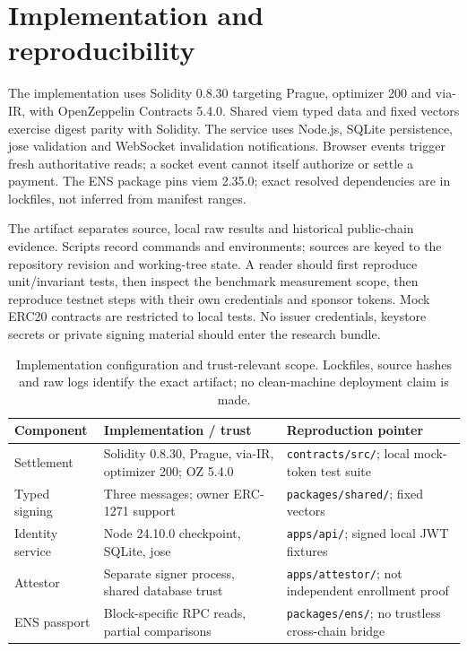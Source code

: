 \documentclass[11pt]{article}
\newcommand{\code}[1]{\nolinkurl{#1}}
\begin{document}

\section{Implementation and reproducibility}
The implementation uses Solidity 0.8.30 targeting Prague, optimizer 200 and via-IR, with OpenZeppelin Contracts 5.4.0. Shared viem typed data and fixed vectors exercise digest parity with Solidity. The service uses Node.js, SQLite persistence, jose validation and WebSocket invalidation notifications. Browser events trigger fresh authoritative reads; a socket event cannot itself authorize or settle a payment. The ENS package pins viem 2.35.0; exact resolved dependencies are in lockfiles, not inferred from manifest ranges.

The artifact separates source, local raw results and historical public-chain evidence. Scripts record commands and environments; sources are keyed to the repository revision and working-tree state. A reader should first reproduce unit/invariant tests, then inspect the benchmark measurement scope, then reproduce testnet steps with their own credentials and sponsor tokens. Mock ERC20 contracts are restricted to local tests. No issuer credentials, keystore secrets or private signing material should enter the research bundle.

\begin{table}[htbp]\centering\small
\begin{tabular}{p{.23\linewidth}p{.34\linewidth}p{.33\linewidth}}\toprule
Component & Implementation / trust & Reproduction pointer\\\midrule
Settlement & Solidity 0.8.30, Prague, via-IR, optimizer 200; OZ 5.4.0 & \code{contracts/src/}; local mock-token test suite\\
Typed signing & Three messages; owner ERC-1271 support & \code{packages/shared/}; fixed vectors\\
Identity service & Node 24.10.0 checkpoint, SQLite, jose & \code{apps/api/}; signed local JWT fixtures\\
Attestor & Separate signer process, shared database trust & \code{apps/attestor/}; not independent enrollment proof\\
ENS passport & Block-specific RPC reads, partial comparisons & \code{packages/ens/}; no trustless cross-chain bridge\\\bottomrule
\end{tabular}
\caption{Implementation configuration and trust-relevant scope. Lockfiles, source hashes and raw logs identify the exact artifact; no clean-machine deployment claim is made.}\label{tab:implementation}
\end{table}
\end{document}
